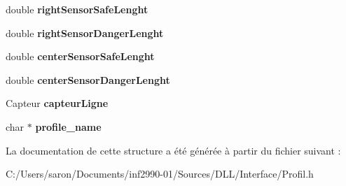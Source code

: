 \begin{DoxyCompactItemize}
\item 
\hypertarget{struct_profil_a0b283554da8102b8c1da9ee043cf951d}{double {\bfseries right\-Sensor\-Safe\-Lenght}}\label{struct_profil_a0b283554da8102b8c1da9ee043cf951d}

\item 
\hypertarget{struct_profil_a0403bdfa2c16549b194542f896d19d7e}{double {\bfseries right\-Sensor\-Danger\-Lenght}}\label{struct_profil_a0403bdfa2c16549b194542f896d19d7e}

\item 
\hypertarget{struct_profil_a010b7b884dce04f8afc44c3ace7c76b7}{double {\bfseries center\-Sensor\-Safe\-Lenght}}\label{struct_profil_a010b7b884dce04f8afc44c3ace7c76b7}

\item 
\hypertarget{struct_profil_aecb1b948ffa0cc6f31dad9bb38e972c5}{double {\bfseries center\-Sensor\-Danger\-Lenght}}\label{struct_profil_aecb1b948ffa0cc6f31dad9bb38e972c5}

\item 
\hypertarget{struct_profil_a89f5e5c0f71cc67ed66a75c8f928adf4}{Capteur {\bfseries capteur\-Ligne}}\label{struct_profil_a89f5e5c0f71cc67ed66a75c8f928adf4}

\item 
\hypertarget{struct_profil_ad09f2fa8bcc112a174647857f5954302}{char $\ast$ {\bfseries profile\-\_\-name}}\label{struct_profil_ad09f2fa8bcc112a174647857f5954302}

\end{DoxyCompactItemize}


La documentation de cette structure a été générée à partir du fichier suivant \-:\begin{DoxyCompactItemize}
\item 
C\-:/\-Users/saron/\-Documents/inf2990-\/01/\-Sources/\-D\-L\-L/\-Interface/Profil.\-h\end{DoxyCompactItemize}
